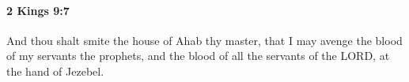 
		\paragraph{2 Kings 9:7} %
			\label{2KINGS-9-7}

			And thou shalt smite the house of Ahab thy master, that I may avenge the blood of my servants the prophets, and the blood of all the servants of the LORD, at the hand of Jezebel.


